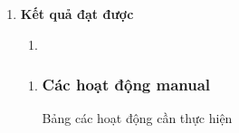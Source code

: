 \begin{enumerate}
\def\labelenumi{\arabic{enumi}.}
\setcounter{enumi}{3}
\item
  \textbf{Kết quả đạt được}

  \begin{enumerate}
  \def\labelenumii{\arabic{enumii}.}
  \tightlist
  \item
  \end{enumerate}

  \begin{enumerate}
  \def\labelenumii{\arabic{enumii}.}
  \item

\subsubsection{Các hoạt động manual}\label{cac-hoat-dong-manual}

    \protect{}\label{Cuxe1c_houx1ea1t_ux111ux1ed9ng_manual}{}Bảng các hoạt động cần thực hiện
  \end{enumerate}
\end{enumerate}
